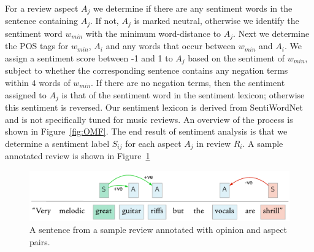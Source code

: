 For a review aspect $A_{j}$ we determine if there are any sentiment words in the sentence containing $A_{j}$. If not, $A_{j}$ is marked neutral, otherwise we identify the sentiment word $w_{min}$ with the minimum word-distance to $A_j$. Next we determine the POS tags for $w_{min}$, $A_i$ and any words that occur between $w_{min}$ and $A_i$. 
We assign a sentiment score between -1 and 1 to $A_j$ based on the sentiment of $w_{min}$, subject to whether the corresponding sentence contains any negation terms within $4$ words of $w_{min}$. If there are no negation terms, then the sentiment assigned to $A_j$ is that of the sentiment word in the sentiment lexicon; otherwise this sentiment is reversed. Our sentiment lexicon is derived from SentiWordNet \cite{esuli2006sentiwordnet} and is not specifically tuned for music reviews.
An overview of the process is shown in Figure~\ref{fig:OMF}. The end result of sentiment analysis is that we determine a sentiment label $S_{ij}$ for each aspect $A_j$ in review $R_i$. A sample annotated review is shown in Figure~\ref{fig:annotatedreview}
\begin{figure}[h]
\includegraphics[width=\columnwidth]{ch07_text-class/pics/annotation_sample2}
\caption{A sentence from a sample review annotated with opinion and aspect pairs.}
\label{fig:annotatedreview}
\end{figure}

